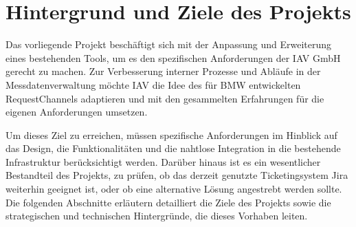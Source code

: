 \chapter{Hintergrund und Ziele des Projekts}
\label{chap:grundlagen}
Das vorliegende Projekt beschäftigt sich mit der Anpassung und Erweiterung eines bestehenden Tools, um es den spezifischen Anforderungen der IAV GmbH gerecht zu machen. Zur Verbesserung interner Prozesse und Abläufe in der Messdatenverwaltung möchte IAV die Idee des für BMW entwickelten RequestChannels adaptieren und mit den gesammelten Erfahrungen für die eigenen Anforderungen umsetzen.

Um dieses Ziel zu erreichen, müssen spezifische Anforderungen im Hinblick auf das Design, die Funktionalitäten und die nahtlose Integration in die bestehende Infrastruktur berücksichtigt werden. Darüber hinaus ist es ein wesentlicher Bestandteil des Projekts, zu prüfen, ob das derzeit genutzte Ticketingsystem Jira weiterhin geeignet ist, oder ob eine alternative Lösung angestrebt werden sollte. Die folgenden Abschnitte erläutern detailliert die Ziele des Projekts sowie die strategischen und technischen Hintergründe, die dieses Vorhaben leiten.
